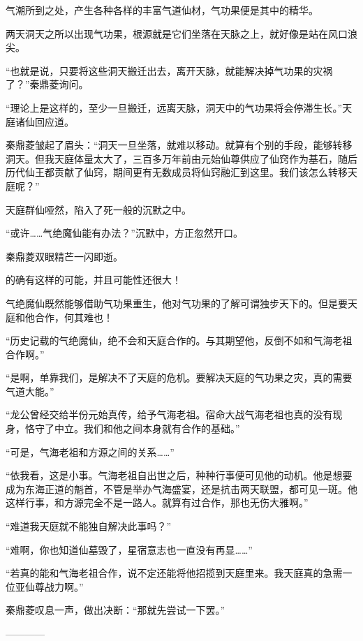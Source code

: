 \begin{this_body}
气潮所到之处，产生各种各样的丰富气道仙材，气功果便是其中的精华。

两天洞天之所以出现气功果，根源就是它们坐落在天脉之上，就好像是站在风口浪尖。

“也就是说，只要将这些洞天搬迁出去，离开天脉，就能解决掉气功果的灾祸了？”秦鼎菱询问。

“理论上是这样的，至少一旦搬迁，远离天脉，洞天中的气功果将会停滞生长。”天庭诸仙回应道。

秦鼎菱皱起了眉头：“洞天一旦坐落，就难以移动。就算有个别的手段，能够转移洞天。但我天庭体量太大了，三百多万年前由元始仙尊供应了仙窍作为基石，随后历代仙王都贡献了仙窍，期间更有无数成员将仙窍融汇到这里。我们该怎么转移天庭呢？”

天庭群仙哑然，陷入了死一般的沉默之中。

“或许……气绝魔仙能有办法？”沉默中，方正忽然开口。

秦鼎菱双眼精芒一闪即逝。

的确有这样的可能，并且可能性还很大！

气绝魔仙既然能够借助气功果重生，他对气功果的了解可谓独步天下的。但是要天庭和他合作，何其难也！

“历史记载的气绝魔仙，绝不会和天庭合作的。与其期望他，反倒不如和气海老祖合作啊。”

“是啊，单靠我们，是解决不了天庭的危机。要解决天庭的气功果之灾，真的需要气道大能。”

“龙公曾经交给半份元始真传，给予气海老祖。宿命大战气海老祖也真的没有现身，恪守了中立。我们和他之间本身就有合作的基础。”

“可是，气海老祖和方源之间的关系……”

“依我看，这是小事。气海老祖自出世之后，种种行事便可见他的动机。他是想要成为东海正道的魁首，不管是举办气海盛宴，还是抗击两天联盟，都可见一斑。他这样行事，和方源完全不是一路人。就算有过合作，那也无伤大雅啊。”

“难道我天庭就不能独自解决此事吗？”

“难啊，你也知道仙墓毁了，星宿意志也一直没有再显……”

“若真的能和气海老祖合作，说不定还能将他招揽到天庭里来。我天庭真的急需一位亚仙尊战力啊。”

秦鼎菱叹息一声，做出决断：“那就先尝试一下罢。”

------------

\end{this_body}

